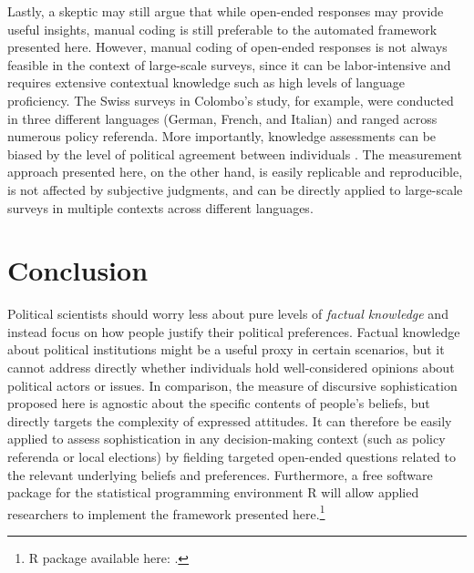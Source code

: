 Lastly, a skeptic may still argue that while open-ended responses may provide useful insights, manual coding is still preferable to the automated framework presented here. However, manual coding of open-ended responses is not always feasible in the context of large-scale surveys, since it can be labor-intensive and requires extensive contextual knowledge such as high levels of language proficiency. The Swiss surveys in Colombo's \citeyearpar{colombo2016justifications} study, for example, were conducted in three different languages (German, French, and Italian) and ranged across numerous policy referenda. More importantly, knowledge assessments can be biased by the level of political agreement between individuals \citep[e.g.,][]{ryan2011accuracy}. The measurement approach presented here, on the other hand, is easily replicable and reproducible, is not affected by subjective judgments, and can be directly applied to large-scale surveys in multiple contexts across different languages.

\section*{Conclusion}

Political scientists should worry less about pure levels of \textit{factual knowledge} and instead focus on how people justify their political preferences. Factual knowledge about political institutions might be a useful proxy in certain scenarios, but it cannot address directly whether individuals hold well-considered opinions about political actors or issues. In comparison, the measure of discursive sophistication proposed here is agnostic about the specific contents of people's beliefs, but directly targets the complexity of expressed attitudes. It can therefore be easily applied to assess sophistication in any decision-making context (such as policy referenda or local elections) by fielding targeted open-ended questions related to the relevant underlying beliefs and preferences. Furthermore, a free software package for the statistical programming environment R will allow applied researchers to implement the framework presented here.\footnote{R package available here: .}

